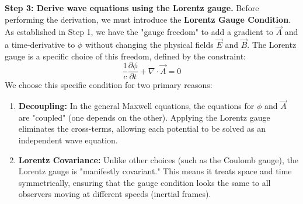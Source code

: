 \begin{solution}
\textbf{Step 3: Derive wave equations using the Lorentz gauge.}
Before performing the derivation, we must introduce the \textbf{Lorentz Gauge Condition}. As established in Step 1, we have the "gauge freedom" to add a gradient to $\vec{A}$ and a time-derivative to $\phi$ without changing the physical fields $\vec{E}$ and $\vec{B}$. The Lorentz gauge is a specific choice of this freedom, defined by the constraint:
\begin{equation*}
    \frac{1}{c} \frac{\partial \phi}{\partial t} + \nabla \cdot \vec{A} = 0
\end{equation*}
We choose this specific condition for two primary reasons:
\begin{enumerate}
    \item \textbf{Decoupling:} In the general Maxwell equations, the equations for $\phi$ and $\vec{A}$ are "coupled" (one depends on the other). Applying the Lorentz gauge eliminates the cross-terms, allowing each potential to be solved as an independent wave equation.
    \item \textbf{Lorentz Covariance:} Unlike other choices (such as the Coulomb gauge), the Lorentz gauge is "manifestly covariant." This means it treats space and time symmetrically, ensuring that the gauge condition looks the same to all observers moving at different speeds (inertial frames).
\end{enumerate}


\end{solution}
